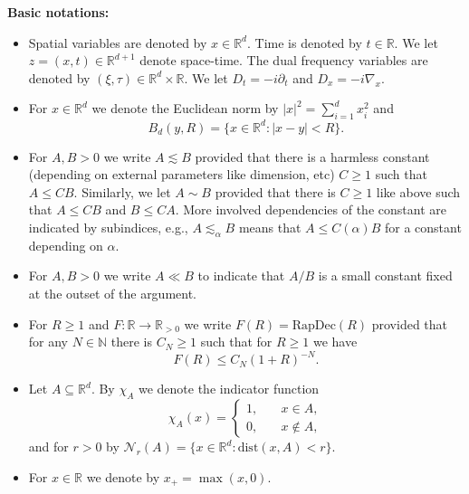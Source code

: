 \documentclass{amsart}
\theoremstyle{definition}
\newcommand{\R}{\mathbb{R}}
\newcommand{\N}{\mathbb{N}}
\begin{document}
\textbf{Basic notations:} 
\begin{itemize}
\item Spatial variables are denoted by $x \in \R^d$. Time is denoted by $t \in \R$. We let $z=(x,t) \in \R^{d+1}$ denote space-time. The dual frequency variables are denoted by $(\xi,\tau) \in \R^d \times \R$. We let $D_t = -i \partial_t$ and $D_x = - i \nabla_x$.  
\item For $x \in \R^d$ we denote the Euclidean norm by $|x|^2 = \sum_{i=1}^d x_i^2$ and 
\begin{equation*}
    B_d(y,R)= \{ x \in \R^d : |x-y| < R \}.
\end{equation*}
\item For $A, B > 0$ we write $A \lesssim B$ provided that there is a harmless constant (depending on external parameters like dimension, etc) $C \geq 1$ such that $A \leq C B$. Similarly, we let $A \sim B$ provided that there is $C \geq 1$ like above such that $A \leq C B$ and $B \leq C A$. More involved dependencies of the constant are indicated by subindices, e.g., $A \lesssim_{\alpha} B$ means that $A \leq C(\alpha) B$ for a constant depending on $\alpha$.
\item For $A, B > 0$ we write $A \ll B$ to indicate that $A/B$ is a small constant fixed at the outset of the argument.
\item For $R \geq 1$ and $F: \R \to \R_{>0}$ we write $F(R) = \text{RapDec}(R)$
provided that for any $N \in \N$ there is $C_N \geq 1$ such that for $R \geq 1$ we have
\begin{equation*}
F(R) \leq C_N (1 + R)^{-N}.
\end{equation*}
\item Let $A \subseteq \R^d$. By $\chi_A$ we denote the indicator function
\begin{equation*}
   \chi_A(x) = \begin{cases}
        1, &\quad x \in A, \\
        0, &\quad x \notin A,
   \end{cases}
\end{equation*}
and for $r > 0$ by $\mathcal{N}_r(A) = \{ x \in \R^d : \text{dist}(x,A) < r \}.$
\item For $x \in \R$ we denote by $x_+ = \max(x,0)$.
\end{itemize}

\medskip
\end{document}
